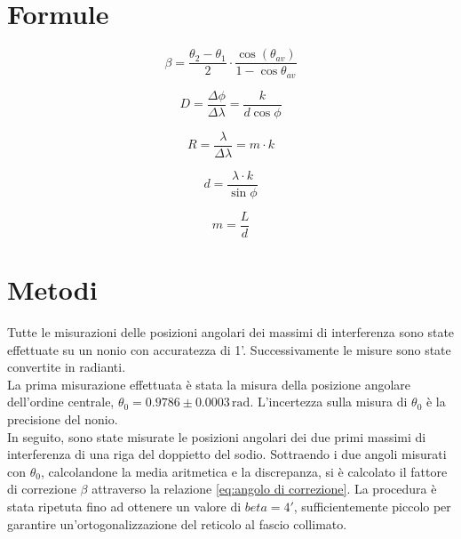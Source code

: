 \documentclass{article}
\begin{document}
    \section{Formule}

        \begin{equation}
            \label{eq:angolo di correzione}
            \beta = \frac{\theta_2 - \theta_1}{2} \cdot \frac{\cos(\theta_{av})}{1 - \cos\theta_{av}}
        \end{equation}

        \begin{equation}
            \label{eq:potere dispersivo}
            D = \frac{\Delta \phi}{\Delta \lambda} = \frac{k}{d \cos{\phi}}
        \end{equation}

        \begin{equation}
            \label{eq:potere risolvente}
            R = \frac{\lambda}{\Delta \lambda} = m \cdot k
        \end{equation}

        \begin{equation}
            \label{eq:passo reticolo}
            d = \frac{\lambda \cdot k}{\sin{\phi}} 
        \end{equation} 

        \begin{equation}
            \label{eq:numero di fenditure}
            m = \frac{L}{d}
        \end{equation}


    \section{Metodi}

        Tutte le misurazioni delle posizioni angolari dei massimi di interferenza sono state effettuate su un nonio con accuratezza di 1'. 
        Successivamente le misure sono state convertite in radianti. \\

        La prima misurazione effettuata è stata la misura della posizione angolare dell'ordine centrale, $\theta_0 = 0.9786	\pm 0.0003 \, \mathrm{rad}$. 
        L'incertezza sulla misura di $\theta_0$ è la precisione del nonio. \\

        In seguito, sono state misurate le posizioni angolari dei due primi massimi di interferenza di una riga del doppietto del sodio. 
        Sottraendo i due angoli misurati con $\theta_0$, calcolandone la media aritmetica e la discrepanza, si è calcolato il fattore di correzione $\beta$ 
        attraverso la relazione \ref{eq:angolo di correzione}. La procedura è stata ripetuta fino ad ottenere un valore di $beta = 4'$, sufficientemente piccolo
        per garantire un'ortogonalizzazione del reticolo al fascio collimato. \\ 
\end{document}
